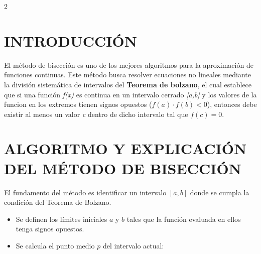 \documentclass{rmf-d}
\begin{document}
\begin{multicols}{2}

\section{INTRODUCCIÓN}
\label{sec:1}
El método de bisección es uno de los mejores algoritmos para la aproximación de funciones continuas. Este método busca resolver ecuaciones no lineales mediante la división sistemática de intervalos del \textbf{Teorema de bolzano}, el cual establece que si una función \textit{f(x)} es continua en un intervalo cerrado \textit{[a,b]} y los valores de la funcion en los extremos tienen signos opuestos ($f(a)\cdot f(b)<0$), entonces debe existir al menos un valor \textit{c} dentro de dicho intervalo tal que $f(c) = 0$.




































\section{ALGORITMO Y EXPLICACIÓN DEL
MÉTODO DE BISECCIÓN}
\label{sec:2}
El fundamento del método es identificar un intervalo $[a,b]$ donde se cumpla la condición del Teorema de Bolzano.


\begin{itemize}
    \item Se definen los límites iniciales $a$ y $b$ tales que la función evaluada en ellos tenga signos opuestos.
    \item Se calcula el punto medio $p$ del intervalo actual:


\end{itemize}
\end{multicols}
\end{document}
